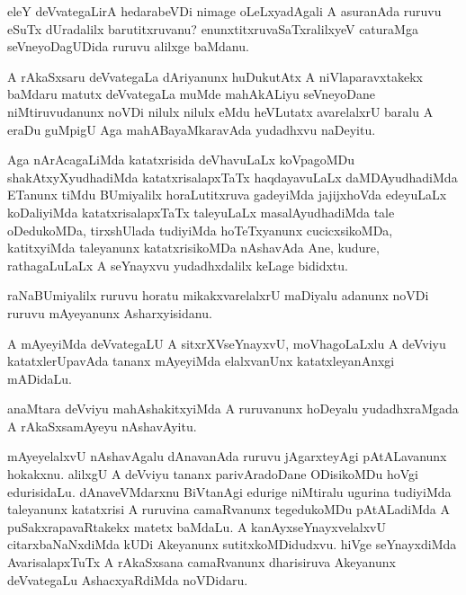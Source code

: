 \begin{mng}
eleY deVvategaLirA hedarabeVDi nimage oLeLxyadAgali A asuranAda ruruvu eSuTx dUradalilx barutitxruvanu? enunxtitxruvaSaTxralilxyeV caturaMga seVneyoDagUDida ruruvu alilxge baMdanu.
\end{mng}

\begin{mng}
A rAkaSxsaru deVvategaLa dAriyanunx huDukutAtx A niVlaparavxtakekx baMdaru matutx deVvategaLa muMde mahAkALiyu seVneyoDane niMtiruvudanunx noVDi nilulx nilulx eMdu heVLutatx avarelalxrU baralu A eraDu guMpigU Aga mahABayaMkaravAda yudadhxvu naDeyitu.
\end{mng}

\begin{mng}
Aga nArAcagaLiMda katatxrisida deVhavuLaLx koVpagoMDu shakAtxyXyudhadiMda katatxrisalapxTaTx haqdayavuLaLx daMDAyudhadiMda ETanunx tiMdu BUmiyalilx horaLutitxruva gadeyiMda jajijxhoVda edeyuLaLx koDaliyiMda katatxrisalapxTaTx taleyuLaLx masalAyudhadiMda tale oDedukoMDa, tirxshUlada tudiyiMda hoTeTxyanunx cucicxsikoMDa, katitxyiMda taleyanunx katatxrisikoMDa nAshavAda Ane, kudure, rathagaLuLaLx A seYnayxvu yudadhxdalilx keLage bididxtu.
\end{mng}

\begin{mng}
raNaBUmiyalilx ruruvu horatu mikakxvarelalxrU maDiyalu adanunx noVDi ruruvu mAyeyanunx Asharxyisidanu.
\end{mng}

\begin{mng}
A mAyeyiMda deVvategaLU A sitxrXVseYnayxvU, moVhagoLaLxlu A deVviyu katatxlerUpavAda tananx mAyeyiMda elalxvanUnx katatxleyanAnxgi mADidaLu.
\end{mng}

\begin{mng}
anaMtara deVviyu mahAshakitxyiMda A ruruvanunx hoDeyalu yudadhxraMgada A rAkaSxsamAyeyu nAshavAyitu.
\end{mng}

\begin{mng}
mAyeyelalxvU nAshavAgalu dAnavanAda ruruvu jAgarxteyAgi pAtALavanunx hokakxnu. alilxgU A deVviyu tananx parivAradoDane ODisikoMDu hoVgi edurisidaLu. dAnaveVMdarxnu BiVtanAgi edurige niMtiralu ugurina tudiyiMda taleyanunx katatxrisi A ruruvina camaRvanunx tegedukoMDu pAtALadiMda A puSakxrapavaRtakekx matetx baMdaLu. A kanAyxseYnayxvelalxvU citarxbaNaNxdiMda kUDi Akeyanunx sutitxkoMDidudxvu. hiVge seYnayxdiMda AvarisalapxTuTx A rAkaSxsana camaRvanunx dharisiruva Akeyanunx deVvategaLu AshacxyaRdiMda noVDidaru.
\end{mng}

